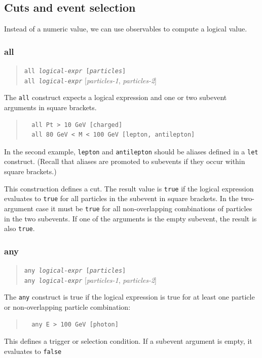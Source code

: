 \documentclass[12pt]{book}
\newcommand{\ttt}[1]{\texttt{#1}}
\begin{document}
\subsection{Cuts and event selection}
\label{sec:cuts}

Instead of a numeric value, we can use observables to compute a logical value.

\subsubsection{all}
\begin{quote}
\begin{footnotesize}
  \ttt{all \textit{logical-expr} [\textit{particles}]} \\
  \ttt{all \textit{logical-expr}} [\textit{particles-1}, \textit{particles-2}]
\end{footnotesize}
\end{quote}
The \ttt{all} construct expects a logical expression and one or two subevent
arguments in square brackets.
\begin{quote}
\begin{footnotesize}
\begin{verbatim}
  all Pt > 10 GeV [charged]
  all 80 GeV < M < 100 GeV [lepton, antilepton]
\end{verbatim}
\end{footnotesize}
\end{quote}
In the second example, \ttt{lepton} and \ttt{antilepton} should be aliases
defined in a \ttt{let} construct.  (Recall that aliases are promoted to
subevents if they occur within square brackets.)

This construction defines a cut.  The result value is \ttt{true} if the
logical expression evaluates to \ttt{true} for all particles in the subevent
in square brackets.  In the two-argument case it must be \ttt{true} for all
non-overlapping combinations of particles in the two subevents.  If one of the
arguments is the empty subevent, the result is also \ttt{true}.

\subsubsection{any}
\begin{quote}
\begin{footnotesize}
  \ttt{any \textit{logical-expr} [\textit{particles}]} \\
  \ttt{any \textit{logical-expr}} [\textit{particles-1}, \textit{particles-2}]
\end{footnotesize}
\end{quote}
The \ttt{any} construct is true if the logical expression is true for at least
one particle or non-overlapping particle combination:
\begin{quote}
\begin{footnotesize}
\begin{verbatim}
  any E > 100 GeV [photon]
\end{verbatim}
\end{footnotesize}
\end{quote}
This defines a trigger or selection condition.  If a subevent argument is
empty, it evaluates to \ttt{false}
\end{document}
